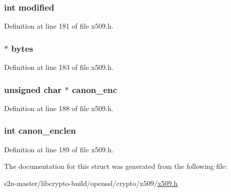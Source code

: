 \subsubsection[{\texorpdfstring{modified}{modified}}]{\setlength{\rightskip}{0pt plus 5cm}int modified}\hypertarget{struct_x509__name__st_a0826efcc81bba9d934e1207721a46ddf}{}\label{struct_x509__name__st_a0826efcc81bba9d934e1207721a46ddf}


Definition at line 181 of file x509.\+h.

\subsubsection[{\texorpdfstring{bytes}{bytes}}]{ $\ast$ bytes}\hypertarget{struct_x509__name__st_acc4709a60bb92b3f6867215f6345450e}{}\label{struct_x509__name__st_acc4709a60bb92b3f6867215f6345450e}


Definition at line 183 of file x509.\+h.

\subsubsection[{\texorpdfstring{canon\+\_\+enc}{canon_enc}}]{\setlength{\rightskip}{0pt plus 5cm}unsigned char $\ast$ canon\+\_\+enc}\hypertarget{struct_x509__name__st_ab98aa42900a7797413b946429f0ca0f9}{}\label{struct_x509__name__st_ab98aa42900a7797413b946429f0ca0f9}


Definition at line 188 of file x509.\+h.

\subsubsection[{\texorpdfstring{canon\+\_\+enclen}{canon_enclen}}]{\setlength{\rightskip}{0pt plus 5cm}int canon\+\_\+enclen}\hypertarget{struct_x509__name__st_ab0c75717ca29f7c83cbb1cf10566e8b2}{}\label{struct_x509__name__st_ab0c75717ca29f7c83cbb1cf10566e8b2}


Definition at line 189 of file x509.\+h.



The documentation for this struct was generated from the following file\+:\begin{DoxyCompactItemize}
\item 
s2n-\/master/libcrypto-\/build/openssl/crypto/x509/\hyperlink{crypto_2x509_2x509_8h}{x509.\+h}\end{DoxyCompactItemize}
